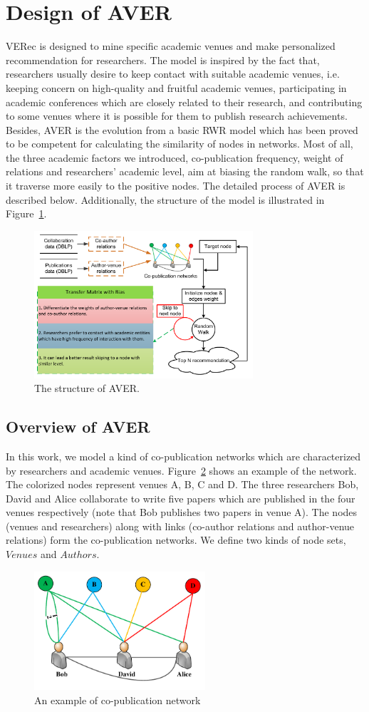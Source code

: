 \documentclass[9pt]{acm_proc_article-sp}
\begin{document}
\section{Design of AVER}
VERec is designed to mine specific academic venues and make personalized recommendation for researchers. The model is inspired by the fact that, researchers usually desire to keep contact with suitable academic venues, i.e. keeping concern on high-quality and fruitful academic venues, participating in academic conferences which are closely related to their research, and contributing to some venues where it is possible for them to publish research achievements. Besides, AVER is the evolution from a basic RWR model which has been proved to be competent for calculating the similarity of nodes in networks. Most of all, the three academic factors we introduced, co-publication frequency, weight of relations and researchers' academic level, aim at biasing the random walk, so that it traverse more easily to the positive nodes. The detailed process of AVER is described below. Additionally, the structure of the model is illustrated in Figure~\ref{Fig1}.
\begin{figure}[!ht]
\centering
\includegraphics [width=3.2in]{Fig1.pdf}
\caption{The structure of AVER.}
\label{Fig1}
\end{figure}
\subsection{Overview of AVER}
In this work, we model a kind of co-publication networks which are characterized by researchers and academic venues. Figure~\ref{Fig2} shows an example of the network. The colorized nodes represent venues A, B, C and D. The three researchers Bob, David and Alice collaborate to write five papers which are published in the four venues respectively (note that Bob publishes two papers in venue A). The nodes (venues and researchers) along with links (co-author relations and author-venue relations) form the co-publication networks. We define two kinds of node sets, $Venues$ and $Authors$.
\begin{figure}[t]
\centering
\includegraphics [width=2.5in]{Fig2.pdf}
\caption{An example of co-publication network}
\label{Fig2}
\end{figure}
\end{document}
